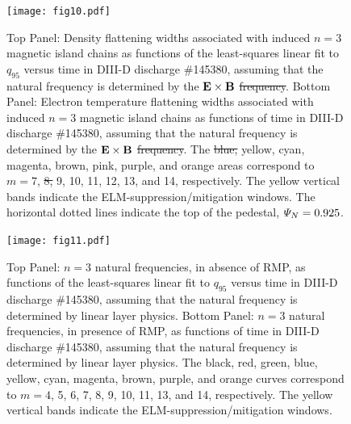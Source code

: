 \documentclass[12pt,prb,aps]{revtex4-1}
\providecommand{\DIFadd}[1]{{\protect\color{blue}\uwave{#1}}} %
\providecommand{\DIFdel}[1]{{\protect\color{red}\sout{#1}}}                      %
\providecommand{\DIFaddFL}[1]{\DIFadd{#1}} %
\providecommand{\DIFdelFL}[1]{\DIFdel{#1}} %
\providecommand{\DIFaddbeginFL}{} %
\providecommand{\DIFaddendFL}{} %
\providecommand{\DIFdelbeginFL}{} %
\providecommand{\DIFdelendFL}{} %
\begin{document}
\begin{figure}
\DIFdelbeginFL %
\DIFdelendFL \DIFaddbeginFL \texttt{[image: fig10.pdf]}
\DIFaddendFL \caption{Top Panel: Density flattening widths associated with induced $n=3$ magnetic island  chains as functions of the least-squares linear fit to $q_{95}$ versus time
in   DIII-D discharge \#145380, assuming that the natural frequency is  determined by the \DIFaddbeginFL \DIFaddFL{local }\DIFaddendFL ${\bf E}\times {\bf B}$
\DIFdelbeginFL \DIFdelFL{frequency}\DIFdelendFL \DIFaddbeginFL \DIFaddFL{velocity}\DIFaddendFL .
Bottom Panel:  Electron temperature flattening widths associated with induced $n=3$ magnetic island chains as functions of time
in   DIII-D discharge \#145380, assuming that the natural frequency is determined by the \DIFaddbeginFL \DIFaddFL{local }\DIFaddendFL ${\bf E}\times {\bf B}$
\DIFdelbeginFL \DIFdelFL{frequency}\DIFdelendFL \DIFaddbeginFL \DIFaddFL{velocity}\DIFaddendFL . The \DIFdelbeginFL \DIFdelFL{blue, }\DIFdelendFL yellow, cyan, magenta, brown, pink,
purple, and orange  areas correspond to \DIFdelbeginFL \DIFdelFL{$m=7$}\DIFdelendFL \DIFaddbeginFL \DIFaddFL{$m=8$}\DIFaddendFL , \DIFdelbeginFL \DIFdelFL{8, }\DIFdelendFL 9, 10, 11, 12, 13, and 14, respectively. The yellow vertical bands indicate the ELM-suppression/mitigation windows. 
The horizontal dotted lines indicate the top of the pedestal, ${\mit\Psi}_N=0.925$.} \label{fig10}
\end{figure}

\begin{figure}
\DIFdelbeginFL %
\DIFdelendFL \DIFaddbeginFL \texttt{[image: fig11.pdf]}
\DIFaddendFL \caption{Top Panel: $n=3$ natural frequencies, in absence of RMP, as functions of the least-squares linear fit to $q_{95}$ versus time
in   DIII-D discharge \#145380, assuming that the natural frequency is determined by linear layer physics.
Bottom Panel:  $n=3$ natural frequencies, in presence of RMP, as functions of time
in   DIII-D discharge \#145380, assuming that the natural frequency is determined by linear layer physics. The black, red, green, blue, yellow, cyan, magenta,  brown, 
purple, and orange curves correspond to $m=4$, 5, 6, 7, 8, 9, 10,  11, 13, and 14, respectively. The yellow vertical bands indicate the ELM-suppression/mitigation windows.} \label{fig11}
\end{figure}
\end{document}
